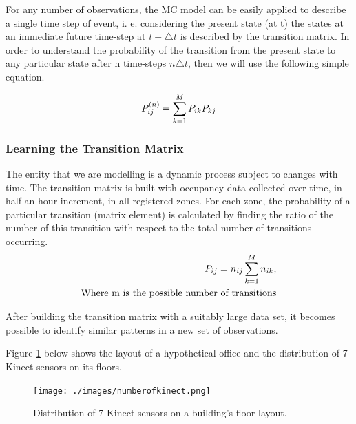 For any number of observations, the MC model can be easily applied to describe a single time step of event, i. e.  considering the present state (at t) the states at an immediate future time-step at ${t  + \triangle t}$  is described by the transition matrix.   In order to understand the probability of the transition from the present state to any particular state after n time-steps ${n \triangle t}$, then  we will use the following simple equation.

\begin{equation}
 \centering
\label{equ:4}
P_{ij}^{(n)} = \sum_{k=1}^{M} P_{ik} P_{kj}
\end{equation}

\subsubsection{Learning the Transition Matrix}
The entity that we are modelling is a dynamic process subject to changes with time. The transition matrix is built with occupancy data collected over time, in half an hour increment, in all registered zones.  For each zone, the probability of a particular transition (matrix element) is calculated by finding the ratio of the number of this transition with respect to the total number of transitions occurring.
\begin{equation}
 \centering
\begin{split}
\label{equ:5}
P_{ij} = n_{ij} \/ \sum_{k=1}^{M}  n_{ik} ,  \\
\text{Where m is the possible number of transitions}
\end{split}
\end{equation}


After building the transition matrix with a suitably large data set, it becomes possible to identify similar patterns in a new set of observations.

 Figure \ref{fig:occupflow} below shows the layout of a hypothetical office and the distribution of 7 Kinect sensors on its floors.
\begin{figure}[!ht]
  \centering
 	  	\texttt{[image: ./images/numberofkinect.png]}
  \caption{Distribution of 7 Kinect sensors on a building's floor layout.}\label{fig:occupflow}
\end{figure}


